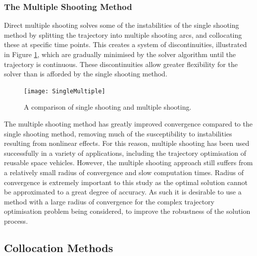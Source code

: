 \subsubsection{The Multiple Shooting Method}
Direct multiple shooting solves some of the instabilities of the single shooting method by splitting the trajectory into multiple shooting arcs, and collocating these at specific time points\cite{Betts1998,Kelly2015,Rao2009,Fasano2013}. This creates a system of discontinuities, illustrated in Figure \ref{fig:multipleshooting}, which are gradually minimised by the solver algorithm until the trajectory is continuous. These discontinuities allow greater flexibility for the solver than is afforded by the single shooting method. 

\begin{figure}[ht]
	\centering
	\texttt{[image: SingleMultiple]}
	\caption{A comparison of single shooting and multiple shooting\cite{Kelly2015}.}
	\label{fig:multipleshooting}
\end{figure}

The multiple shooting method has greatly improved convergence compared to the single shooting method, removing much of the susceptibility to instabilities resulting from nonlinear effects. For this reason, multiple shooting has been used successfully in a variety of applications, including the trajectory optimisation of reusable space vehicles\cite{Maddock2018}. However, the multiple shooting approach still suffers from a relatively small radius of convergence and slow computation times\cite{Fasano2013}. Radius of convergence is extremely important to this study as the optimal solution cannot be approximated to a great degree of accuracy. As such it is desirable to use a method with a large radius of convergence for the complex trajectory optimisation problem being considered, to improve the robustness of the solution process.

\subsection{Collocation Methods}

